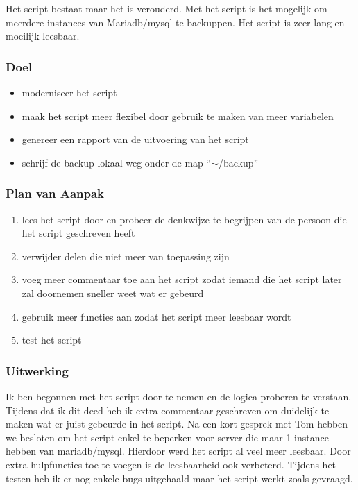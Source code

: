 Het script bestaat maar het is verouderd. Met het script is het mogelijk om meerdere instances van Mariadb/mysql te backuppen. Het script is zeer lang en moeilijk leesbaar.

\subsubsection{Doel}

\begin{itemize}
    \item moderniseer het script
    \item maak het script meer flexibel door gebruik te maken van meer variabelen
    \item genereer een rapport van de uitvoering van het script
    \item schrijf de backup lokaal weg onder de map ``$\sim$/backup''
\end{itemize}

\subsubsection{Plan van Aanpak}

\begin{enumerate}
    \item lees het script door en probeer de denkwijze te begrijpen van de persoon die het script geschreven heeft
    \item verwijder delen die niet meer van toepassing zijn
    \item voeg meer commentaar toe aan het script zodat iemand die het script later zal doornemen sneller weet wat er gebeurd
    \item gebruik meer functies aan zodat het script meer leesbaar wordt
    \item test het script
\end{enumerate}

\subsubsection{Uitwerking}

Ik ben begonnen met het script door te nemen en de logica proberen te verstaan. Tijdens dat ik dit deed heb ik extra commentaar geschreven om duidelijk te maken wat er juist gebeurde in het script. Na een kort gesprek met Tom hebben we besloten om het script enkel te beperken voor server die maar 1 instance hebben van mariadb/mysql. Hierdoor werd het script al veel meer leesbaar. Door extra hulpfuncties toe te voegen is de leesbaarheid ook verbeterd. Tijdens het testen heb ik er nog enkele bugs uitgehaald maar het script werkt zoals gevraagd.

